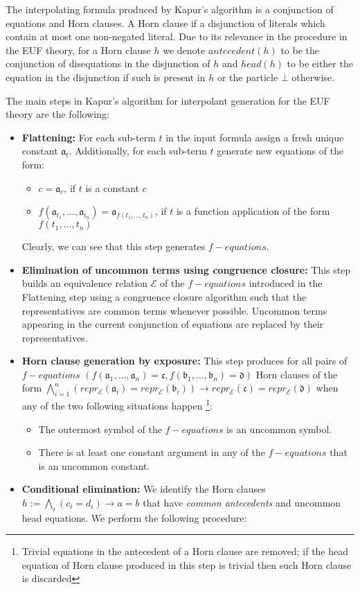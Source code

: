 The interpolating formula produced by Kapur's algorithm is a conjunction of equations
and Horn clauses. A Horn clause if a disjunction of literals which contain at most
one non-negated literal.
Due to its relevance in the procedure in the EUF theory, for a Horn clause $h$
we denote $antecedent(h)$ to be the conjunction of disequations in the disjunction of $h$ 
and $head(h)$ to be either the equation in the disjunction if such is present in $h$ 
or the particle $\bot$ otherwise.

The main steps in Kapur's algorithm for interpolant generation for the EUF theory
are the following:

\begin{itemize}
  \item \textbf{Flattening:} 
    For each sub-term $t$ in the input formula assign a fresh unique constant $\mathfrak{a}_t$. 
    Additionally, for each sub-term $t$ generate new equations of the form:
    \begin{itemize}
      \item $c = \mathfrak{a}_c$, if $t$ is a constant $c$
      \item $f(\mathfrak{a}_{t_1}, \dots, \mathfrak{a}_{t_n}) 
        = \mathfrak{a}_{f(t_1, \dots, t_n)}$, if $t$ is a 
        function application of the form $f(t_1, \dots, t_n)$
    \end{itemize}
    Clearly, we can see that this step generates $f-equations$.
  \item \textbf{Elimination of uncommon terms using congruence closure:}
    This step builds an equivalence 
    relation $\mathcal{E}$ of the $f-equations$ introduced in the 
    Flattening step using a congruence closure algorithm such 
    that the representatives are common terms
    whenever possible. Uncommon terms appearing in the current conjunction of 
    equations are replaced by their representatives.
  \item \textbf{Horn clause generation by exposure:} 
    This step produces for all pairs of $f-equations$ 
    $(f(\mathfrak{a}_1, \dots, \mathfrak{a}_n) = \mathfrak{c}, 
    f(\mathfrak{b}_1, \dots, \mathfrak{b}_n) = \mathfrak{d})$
    Horn clauses of the form 
    $\bigwedge_{i=1}^n(repr_{\mathcal{E}}(\mathfrak{a}_i) = repr_{\mathcal{E}}(\mathfrak{b}_i))
    \rightarrow repr_{\mathcal{E}}(\mathfrak{c}) = repr_{\mathcal{E}}(\mathfrak{d})$
    when any of the two following situations happen \footnote{Trivial equations in the antecedent
    of a Horn clause are removed; if the head equation of Horn clause produced in this 
    step is trivial then such Horn clause is discarded}:
    \begin{itemize}
      \item The outermost symbol of the $f-equations$ is an uncommon symbol.
      \item There is at least one constant argument in any of the $f-equations$ 
        that is an uncommon constant.
    \end{itemize}
  \item \textbf{Conditional elimination:} 
    We identify the Horn clauses $h := \bigwedge_i (c_i = d_i) \rightarrow a = b$
    that have \emph{common antecedents} and uncommon head equations. 
    We perform the following procedure: 


\end{itemize}
